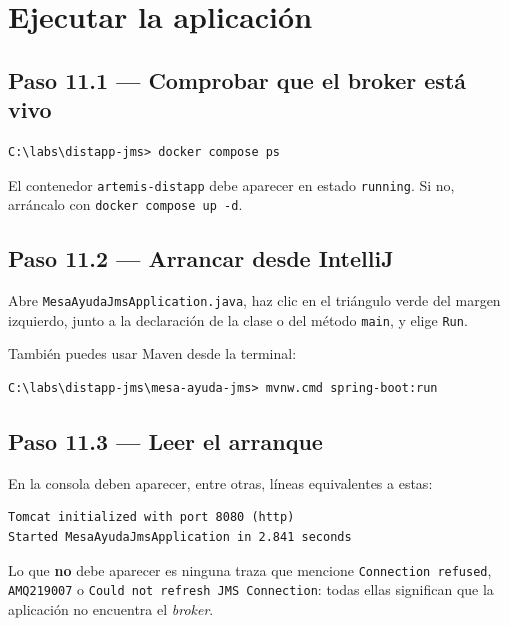 \documentclass[11pt,a4paper]{book}
\newcommand{\ruta}[1]{\texttt{#1}}
\begin{document}
\chapter{Ejecutar la aplicación}
\label{cap:ejecutar}

\section{Paso 11.1 --- Comprobar que el broker está vivo}

\begin{lstlisting}[language=consola,caption={Verificación previa},label={lst:previa}]
C:\labs\distapp-jms> docker compose ps
\end{lstlisting}

El contenedor \texttt{artemis-distapp} debe aparecer en estado \texttt{running}.
Si no, arráncalo con \texttt{docker compose up -d}.

\section{Paso 11.2 --- Arrancar desde IntelliJ}

Abre \ruta{MesaAyudaJmsApplication.java}, haz clic en el triángulo verde del margen izquierdo, junto a la declaración de la clase o del método \texttt{main}, y elige \texttt{Run}.

También puedes usar Maven desde la terminal:

\begin{lstlisting}[language=consola,caption={Arranque desde la línea de comandos},label={lst:mvnrun}]
C:\labs\distapp-jms\mesa-ayuda-jms> mvnw.cmd spring-boot:run
\end{lstlisting}

\section{Paso 11.3 --- Leer el arranque}

En la consola deben aparecer, entre otras, líneas equivalentes a estas:

\begin{lstlisting}[language=consola,caption={Salida esperada al arrancar},label={lst:arranquesalida}]
Tomcat initialized with port 8080 (http)
Started MesaAyudaJmsApplication in 2.841 seconds
\end{lstlisting}

Lo que \textbf{no} debe aparecer es ninguna traza que mencione \texttt{Connection refused}, \texttt{AMQ219007} o \texttt{Could not refresh JMS Connection}: todas ellas significan que la aplicación no encuentra el \emph{broker}.
\end{document}

